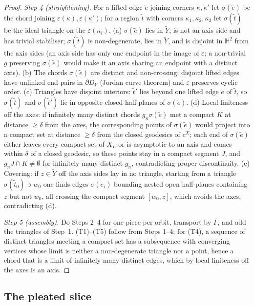 \documentclass[aps,prd,onecolumn,superscriptaddress,nofootinbib,amsmath,amssymb,11pt]{revtex4-2}
\theoremstyle{definition}
\newcommand{\Hyp}{\mathbb{H}^2}
\begin{document}
\begin{proof}
\emph{Step 4 (straightening).} For a lifted edge $\tilde e$ joining corners $\kappa,\kappa'$ let $\sigma(\tilde e)$ be the chord
joining $\varepsilon(\kappa),\varepsilon(\kappa')$; for a region $\tilde t$ with corners $\kappa_1,\kappa_2,\kappa_3$ let
$\sigma(\tilde t)$ be the ideal triangle on the $\varepsilon(\kappa_i)$. (a) $\sigma(\tilde e)$ lies in $\tilde Y$, is not an axis
side and has trivial stabiliser; $\sigma(\tilde t)$ is non-degenerate, lies in $\tilde Y$, and is disjoint in $\Hyp$ from the axis
sides (an axis side has only one endpoint in the image of $\varepsilon$; a non-trivial $g$ preserving $\sigma(\tilde e)$ would
make it an axis sharing an endpoint with a distinct axis). (b) The chords $\sigma(\tilde e)$ are distinct and non-crossing:
disjoint lifted edges have unlinked end pairs in $\partial D_Y$ (Jordan curve theorem) and $\varepsilon$ preserves cyclic order.
(c) Triangles have disjoint interiors: $\tilde t'$ lies beyond one lifted edge $\tilde e$ of $\tilde t$, so $\sigma(\tilde t)$ and
$\sigma(\tilde t')$ lie in opposite closed half-planes of $\sigma(\tilde e)$. (d) Local finiteness off the axes: if infinitely
many distinct chords $g_n\sigma(\tilde e)$ met a compact $K$ at distance $\ge\delta$ from the axes, the corresponding points of
$\sigma(\tilde e)$ would project into a compact set at distance $\ge\delta$ from the closed geodesics of $c^X$; each end of
$\sigma(\tilde e)$ either leaves every compact set of $X_L$ or is asymptotic to an axis and comes within $\delta$ of a closed
geodesic, so these points stay in a compact segment $J$, and $g_nJ\cap K\ne\emptyset$ for infinitely many distinct $g_n$,
contradicting proper discontinuity. (e) Covering: if $z\in\tilde Y$ off the axis sides lay in no triangle, starting from a
triangle $\sigma(\tilde t_0)\ni w_0$ one finds edges $\sigma(\tilde e_i)$ bounding nested open half-planes containing $z$ but not
$w_0$, all crossing the compact segment $[w_0,z]$, which avoids the axes, contradicting (d).

\emph{Step 5 (assembly).} Do Steps 2--4 for one piece per orbit, transport by $\Gamma$, and add the triangles of Step~1.
(T1)--(T5) follow from Steps 1--4; for (T4), a sequence of distinct triangles meeting a compact set has a subsequence with
converging vertices whose limit is neither a non-degenerate triangle nor a point, hence a chord that is a limit of
infinitely many distinct edges, which by local finiteness off the axes is an axis.
\end{proof}

\subsection{The pleated slice}
\end{document}
